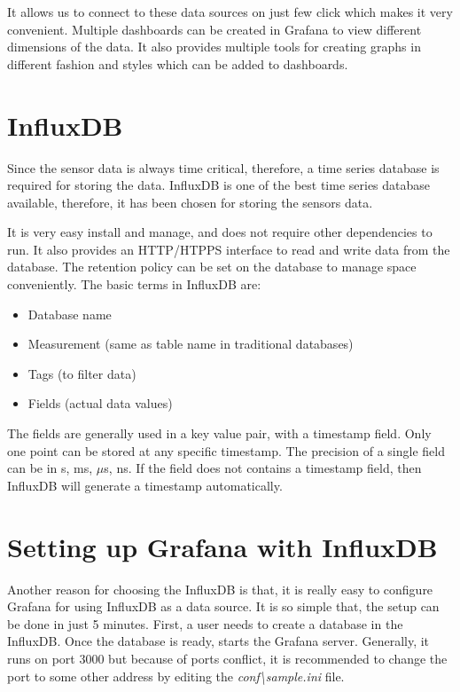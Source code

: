 It allows us to connect to these data sources on just few click which makes it very convenient. Multiple dashboards can be created in Grafana to view different dimensions of the data. It also provides multiple tools for creating graphs in different fashion and styles which can be added to dashboards.

\section{InfluxDB}
 Since the sensor data is always time critical, therefore, a time series database is required for storing the data. InfluxDB is one of the best time series database available, therefore, it has been chosen for storing the sensors data. 
 
 It is very easy install and manage, and does not require other dependencies to run. It also provides an HTTP/HTPPS interface to read and write data from the database. The retention policy can be set on the database to manage space conveniently. The basic terms in InfluxDB are:
 
 \begin{itemize}
 	\item Database name
 	\item Measurement (same as table name in traditional databases)
 	\item Tags (to filter data)
 	\item Fields (actual data values)
 \end{itemize}
 
 The fields are generally used in a key value pair, with a timestamp field. Only one point can be stored at any specific timestamp. The precision of a single field can be in s, ms, $\mu$s, ns. If the field does not contains a timestamp field, then InfluxDB will generate a timestamp automatically.
 
 
 \section{Setting up Grafana with InfluxDB}
 Another reason for choosing the InfluxDB is that, it is really easy to configure Grafana for using InfluxDB as a data source. It is so simple that, the setup can be done in just 5 minutes. First, a user needs to create a database in the InfluxDB. Once the database is ready, starts the Grafana server. Generally, it runs on port 3000 but because of ports conflict, it is recommended to change the port to some other address by editing the \textit{conf\textbackslash sample.ini} file.
 
